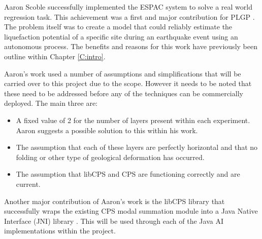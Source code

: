 Aaron Scoble successfully implemented the ESPAC system to solve a real world regression task. This achievement was a first and major contribution for PLGP \cite{scoble1}. The problem itself was to create a model that could reliably estimate the liquefaction potential of a specific site during an earthquake event using an autonomous process. The benefits and reasons for this work have previously been outline within Chapter \ref{C:intro}.

Aaron's work used a number of assumptions and simplifications that will be carried over to this project due to the scope. However it needs to be noted that these need to be addressed before any of the techniques can be commercially deployed. The main three are:


 \begin{itemize}
 \item A fixed value of 2 for the number of layers present within each experiment. Aaron suggests a possible solution to this within his work.
 \item The assumption that each of these layers are perfectly horizontal and that no folding or other type of geological deformation has occurred.
 \item The assumption that libCPS and CPS are functioning correctly and are current.
 \end{itemize}
 
 Another major contribution of Aaron's work is the libCPS library that successfully wraps the existing CPS modal summation module into a Java Native Interface (JNI) library \cite{scoble1}. This will be used through each of the Java AI implementations within the project.

